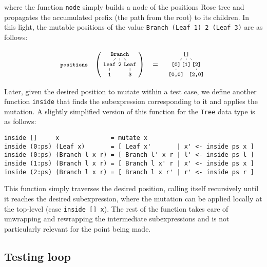 \documentclass[sigconf, anonymous, review]{acmart}
\begin{document}
\noindent where the function \texttt{node} simply builds a node of the positions
Rose tree and propagates the accumulated prefix (the path from the root) to its
children.
%
In this light, the mutable positions of the value \texttt{Branch (Leaf 1) 2
  (Leaf 3)} are as follows:

\vspace{-5pt}
\begin{equation}
  \nonumber
  \footnotesize
  \texttt{positions}\quad
  \left(
  \tikz[
    baseline=-6mm,
    level distance=0.5cm,
    level 1/.style={sibling distance=0.5cm},
    level 2/.style={sibling distance=0.5cm}
  ]{
    \node {\texttt{Branch}}
      child {node {\texttt{Leaf}}
        child {node {\texttt{1}}}
      }
      child {node {\texttt{2}}}
      child {node {\texttt{Leaf}}
        child {node {\texttt{3}}}
      };
  }
  \right)
  \quad
  =
  \quad
  \tikz[
    baseline=-6mm,
    level distance=0.5cm,
    level 1/.style={sibling distance=0.5cm},
    level 2/.style={sibling distance=0.5cm}
  ]{
    \node {\texttt{[]}}
      child {node {\texttt{[0]}}
        child {node {\texttt{[0,0]}}}
      }
      child {node {\texttt{[1]}}}
      child {node {\texttt{[2]}}
        child {node {\texttt{[2,0]}}}
      };
  }
\end{equation}

\noindent Later, given the desired position to mutate within a test case, we
define another function \texttt{inside} that finds the subexpression
corresponding to it and applies the mutation.
%
A slightly simplified version of this function for the \texttt{Tree} data type is
as follows:

\begin{verbatim}
inside []     x              = mutate x
inside (0:ps) (Leaf x)       = [ Leaf x'       | x' <- inside ps x ]
inside (0:ps) (Branch l x r) = [ Branch l' x r | l' <- inside ps l ]
inside (1:ps) (Branch l x r) = [ Branch l x' r | x' <- inside ps x ]
inside (2:ps) (Branch l x r) = [ Branch l x r' | r' <- inside ps r ]
\end{verbatim}

\noindent This function simply traverses the desired position, calling itself
recursively until it reaches the desired subexpression, where the mutation can
be applied locally at the top-level (case \texttt{inside [] x}).
%
The rest of the function takes care of unwrapping and rewrapping the
intermediate subexpressions and is not particularly relevant for the point being
made.


\subsection{Testing loop}
\end{document}
